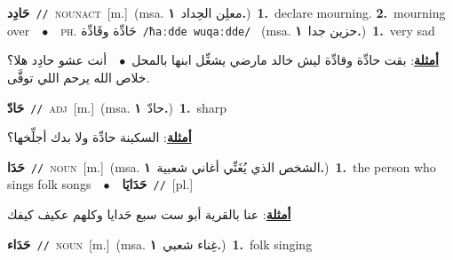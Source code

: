 \documentclass[10pt,a4paper,twoside]{article} %
\begin{document}
\begin{multicols}{2}
{\setlength\topsep{0pt}\textbf{\foreignlanguage{arabic}{حَادِد}}\ {\color{gray}\texttt{//}\color{black}}\ \textsc{noun\textunderscore act}\ [m.]\ \color{gray}(msa. \foreignlanguage{arabic}{معلِن الحِداد}~\foreignlanguage{arabic}{\textbf{١.}})\color{black}\ \textbf{1.}~declare mourning.  \textbf{2.}~mourning over\ \ $\bullet$\ \ \textsc{ph.} \color{gray} \foreignlanguage{arabic}{حَادِّة وقَادِّة}\color{black}\ {\color{gray}\texttt{/{\sffamily ħaːdde wuqaːdde}/}\color{black}}\ \color{gray} (msa. \foreignlanguage{arabic}{حزين جدا}~\foreignlanguage{arabic}{\textbf{١.}})\color{black}\ \textbf{1.}~very sad\  \begin{flushright}\color{gray}\foreignlanguage{arabic}{\textbf{\underline{\foreignlanguage{arabic}{أمثلة}}}: بقت حادِّة وقادِّة ليش خالد مارضي يشغِّل ابنها بالمحل\ $\bullet$\ \  أنت عشو حادِد هلا؟ خلاص الله يرحم اللي توفَّى.}\end{flushright}\color{black}} \vspace{2mm}

{\setlength\topsep{0pt}\textbf{\foreignlanguage{arabic}{حَادّ}}\ {\color{gray}\texttt{//}\color{black}}\ \textsc{adj}\ [m.]\ \color{gray}(msa. \foreignlanguage{arabic}{حادّ}~\foreignlanguage{arabic}{\textbf{١.}})\color{black}\ \textbf{1.}~sharp\  \begin{flushright}\color{gray}\foreignlanguage{arabic}{\textbf{\underline{\foreignlanguage{arabic}{أمثلة}}}: السكينة حادِّة ولا بدك أجلِّخها؟}\end{flushright}\color{black}} \vspace{2mm}

{\setlength\topsep{0pt}\textbf{\foreignlanguage{arabic}{حَدَا}}\ {\color{gray}\texttt{//}\color{black}}\ \textsc{noun}\ [m.]\ \color{gray}(msa. \foreignlanguage{arabic}{الشخص الذي يُغَنِّي أغاني شعبية}~\foreignlanguage{arabic}{\textbf{١.}})\color{black}\ \textbf{1.}~the person who sings folk songs\ \ $\bullet$\ \ \setlength\topsep{0pt}\textbf{\foreignlanguage{arabic}{حَدَايَا}}\ {\color{gray}\texttt{//}\color{black}}\ [pl.]\  \begin{flushright}\color{gray}\foreignlanguage{arabic}{\textbf{\underline{\foreignlanguage{arabic}{أمثلة}}}: عنا بالقرية أبو ست سبع حَدايا وكلهم عكيف كيفك}\end{flushright}\color{black}} \vspace{2mm}

{\setlength\topsep{0pt}\textbf{\foreignlanguage{arabic}{حَدَاء}}\ {\color{gray}\texttt{//}\color{black}}\ \textsc{noun}\ [m.]\ \color{gray}(msa. \foreignlanguage{arabic}{غِناء شعبي}~\foreignlanguage{arabic}{\textbf{١.}})\color{black}\ \textbf{1.}~folk singing\ } \vspace{2mm}


\end{multicols}
\end{document}
